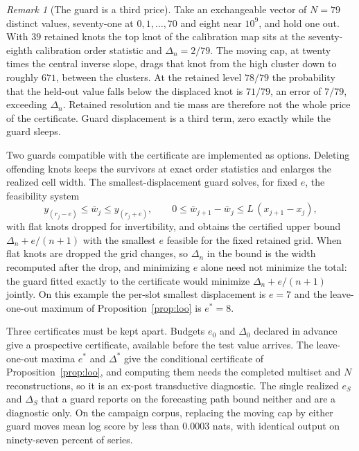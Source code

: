 \documentclass[11pt]{article}
\theoremstyle{remark}
\newtheorem{remark}[proposition]{Remark}
\begin{document}
\begin{remark}[The guard is a third price]\label{rem:guard}
Take an exchangeable vector of $N = 79$ distinct values, seventy-one at
$0, 1, \dots, 70$ and eight near $10^9$, and hold one out. With $39$ retained knots
the top knot of the calibration map sits at the seventy-eighth calibration order
statistic and $\Delta_n = 2/79$. The moving cap, at twenty times the central inverse
slope, drags that knot from the high cluster down to roughly $671$, between the
clusters. At the retained level $78/79$ the probability that the held-out value falls
below the displaced knot is $71/79$, an error of $7/79$, exceeding $\Delta_n$.
Retained resolution and tie mass are therefore not the whole price of the
certificate. Guard displacement is a third term, zero exactly while the guard sleeps.

Two guards compatible with the certificate are implemented as options. Deleting
offending knots keeps the survivors at exact order statistics and enlarges the
realized cell width. The smallest-displacement guard solves, for fixed $e$, the
feasibility system
\[
  y_{(r_j - e)} \le \bar w_j \le y_{(r_j + e)}, \qquad
  0 \le \bar w_{j+1} - \bar w_j \le L\,(x_{j+1} - x_j),
\]
with flat knots dropped for invertibility, and obtains the certified upper bound
$\Delta_n + e/(n+1)$ with the smallest $e$ feasible for the fixed retained grid.
When flat knots are dropped the grid changes, so $\Delta_n$ in the bound is the
width recomputed after the drop, and minimizing $e$ alone need not minimize the
total: the guard fitted exactly to the certificate would minimize
$\Delta_n + e/(n+1)$ jointly. On this example the per-slot smallest displacement is
$e = 7$ and the leave-one-out maximum of Proposition~\ref{prop:loo} is $e^* = 8$.

Three certificates must be kept apart. Budgets $e_0$ and $\Delta_0$ declared in
advance give a prospective certificate, available before the test value arrives.
The leave-one-out maxima $e^*$ and $\Delta^*$ give the conditional certificate of
Proposition~\ref{prop:loo}, and computing them needs the completed multiset and $N$
reconstructions, so it is an ex-post transductive diagnostic. The single realized
$e_S$ and $\Delta_S$ that a guard reports on the forecasting path bound neither and
are a diagnostic only.
On the campaign corpus, replacing the moving cap by either guard moves mean log score
by less than $0.0003$ nats, with identical output on ninety-seven percent of series.
\end{remark}
\end{document}
